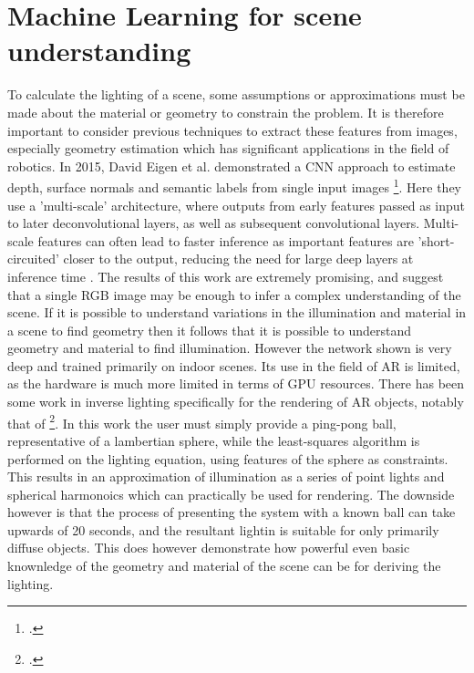 \documentclass[ %
                    author={Gavin Parker},
                supervisor={Dr. Neill Campbell},
                    degree={MEng},
                     title={Deep Siamese Networks for Illumination Estimation from Stereo Images},
                  subtitle={},
                      type={research},
                      year={2018} ]{dissertation}
\begin{document}
\section{Machine Learning for scene understanding}
To calculate the lighting of a scene, some assumptions or approximations must be made about the material or geometry to constrain the problem. It is therefore important to consider previous techniques to extract these features from images, especially geometry estimation which has significant applications in the field of robotics. In 2015, David Eigen et al. demonstrated a CNN approach to estimate depth, surface normals and semantic labels from single input images \footcite{https://arxiv.org/pdf/1411.4734.pdf}. Here they use a 'multi-scale' architecture, where outputs from early features passed as input to later deconvolutional layers, as well as subsequent convolutional layers. Multi-scale features can often lead to faster inference as important features are 'short-circuited' closer to the output, reducing the need for large deep layers at inference time . The results of this work are extremely promising, and suggest that a single RGB image may be enough to infer a complex understanding of the scene. If it is possible to understand variations in the illumination and material in a scene to find geometry then it follows that it is possible to understand geometry and material to find illumination.  However the network shown is very deep and trained primarily on indoor scenes. Its use in the field of AR is limited, as the hardware is much more limited in terms of GPU resources.
\newline
There has been some work in inverse lighting specifically for the rendering of AR objects, notably that of \footcite{https://link.springer.com/content/pdf/10.1007/s00371-010-0501-7.pdf}. In this work the user must simply provide a ping-pong ball, representative of a lambertian sphere, while the least-squares algorithm is performed on the lighting equation, using features of the sphere as constraints. This results in an approximation of illumination as a series of point lights and spherical harmonoics which can practically be used for rendering. The downside however is that the process of presenting the system with a known ball can take upwards of 20 seconds, and the resultant lightin is suitable for only primarily diffuse objects. This does however demonstrate how powerful even basic knownledge of the geometry and material of the scene can be for deriving the lighting.
\end{document}
